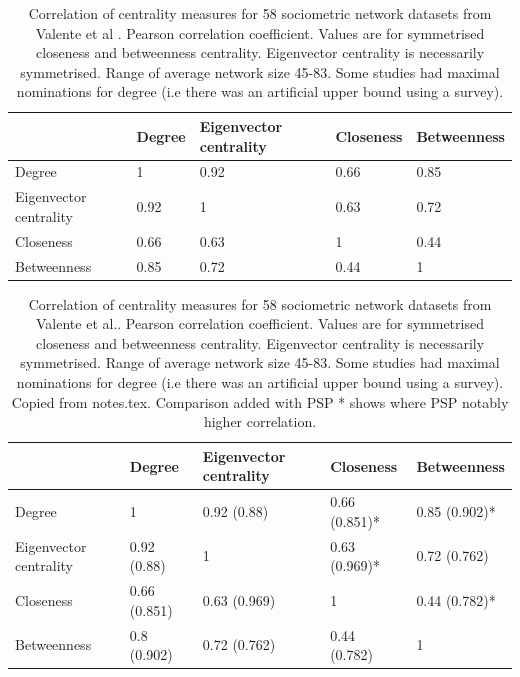 \begin{table}[]
    \centering   \setlength{\extrarowheight}{2pt}
    \begin{tabular}{lllll}
    \toprule
          & Degree & Eigenvector centrality & Closeness & Betweenness \\
         \midrule
    Degree  & 1  & 0.92  & 0.66 & 0.85\\
    Eigenvector centrality & 0.92 & 1 & 0.63 & 0.72  \\
    Closeness & 0.66 & 0.63 & 1 & 0.44  \\
    Betweenness& 0.85 & 0.72 & 0.44 & 1 \\
    \bottomrule
    \end{tabular}
    \caption[Correlation of centrality measures for sociometric networks]{Correlation of centrality measures for 58 sociometric network datasets from Valente et al \cite{valente2008correlated}. Pearson correlation coefficient. Values are for symmetrised closeness and betweenness centrality. Eigenvector centrality is necessarily symmetrised. Range of average network size 45-83. Some studies had maximal nominations for degree (i.e there was an artificial upper bound using a survey).}
    \label{tab:Correlation of centrality valente et al}
\end{table}



\begin{table}[]
    \centering
    \begin{tabular}{lllll}
    \toprule
          & Degree & Eigenvector centrality & Closeness & Betweenness \\
         \midrule
    Degree  & 1  & 0.92 (0.88)  & 0.66 (0.851)*  & 0.85 (0.902)*\\
    Eigenvector centrality & 0.92 (0.88)  & 1 & 0.63 (0.969)* & 0.72 (0.762)  \\
    Closeness & 0.66 (0.851)  & 0.63 (0.969) & 1 & 0.44 (0.782)* \\
    Betweenness& 0.8 (0.902) & 0.72 (0.762) & 0.44 (0.782) & 1 \\
    \bottomrule
    \end{tabular}
    \caption[Correlation of sociometric centrality measures compared with correlation of measures in PSP]{Correlation of centrality measures for 58 sociometric network datasets from Valente et al.\cite{valente2008correlated}. Pearson correlation coefficient. Values are for symmetrised closeness and betweenness centrality. Eigenvector centrality is necessarily symmetrised. Range of average network size 45-83. Some studies had maximal nominations for degree (i.e there was an artificial upper bound using a survey). Copied from notes.tex. Comparison added with PSP * shows where PSP notably higher correlation.}
    \label{tab:Correlation of centrality valente et al compared with PSP}
\end{table}

